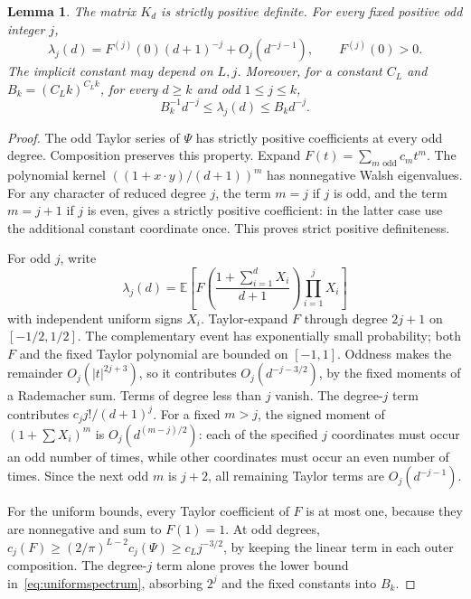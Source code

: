 \documentclass[11pt,a4paper]{article}
\newtheorem{lemma}[theorem]{Lemma}
\theoremstyle{remark}\newtheorem{remark}[theorem]{Remark}
\newcommand{\E}{\mathbb E}\newcommand{\Pp}{\mathbb P}
\begin{document}
\begin{lemma}\label{lem:spectrum}
The matrix $K_d$ is strictly positive definite. For every fixed positive
odd integer $j$,
\begin{equation}\label{eq:spectralasymptotic}
 \lambda_j(d)=F^{(j)}(0)(d+1)^{-j}+O_j(d^{-j-1}),
 \qquad F^{(j)}(0)>0.
\end{equation}
The implicit constant may depend on $L,j$. Moreover, for a constant $C_L$
and $B_k=(C_Lk)^{C_Lk}$, for every $d\ge k$ and odd $1\le j\le k$,
\begin{equation}\label{eq:uniformspectrum}
 B_k^{-1}d^{-j}\le\lambda_j(d)\le B_kd^{-j}.
\end{equation}
\end{lemma}
\begin{proof}
The odd Taylor series of $\Psi$ has strictly positive coefficients at
every odd degree. Composition preserves this property. Expand
$F(t)=\sum_{m\text{ odd}}c_mt^m$. The polynomial kernel
$((1+x\cdot y)/(d+1))^m$ has nonnegative Walsh eigenvalues. For any
character of reduced degree $j$, the term $m=j$ if $j$ is odd, and the
term $m=j+1$ if $j$ is even, gives a strictly positive coefficient:
in the latter case use the additional constant coordinate once. This
proves strict positive definiteness.

For odd $j$, write
\[
 \lambda_j(d)=\E\left[
 F\!\left(\frac{1+\sum_{i=1}^d X_i}{d+1}\right)
 \prod_{i=1}^jX_i\right]
\]
with independent uniform signs $X_i$. Taylor-expand $F$ through degree
$2j+1$ on $[-1/2,1/2]$. The complementary event has exponentially small
probability; both $F$ and the fixed Taylor polynomial are bounded on
$[-1,1]$. Oddness makes the remainder $O_j(|t|^{2j+3})$, so it contributes
$O_j(d^{-j-3/2})$, by the fixed moments of a Rademacher sum. Terms of
degree less than $j$ vanish. The degree-$j$ term contributes
$c_jj!/(d+1)^j$. For a fixed $m>j$, the signed moment of
$(1+\sum X_i)^m$ is $O_j(d^{(m-j)/2})$: each of the specified $j$
coordinates must occur an odd number of times, while other coordinates
must occur an even number of times. Since the next odd $m$ is $j+2$,
all remaining Taylor terms are $O_j(d^{-j-1})$.

For the uniform bounds, every Taylor coefficient of $F$ is at most one,
because they are nonnegative and sum to $F(1)=1$. At odd degrees,
$c_j(F)\ge(2/\pi)^{L-2}c_j(\Psi)\ge c_Lj^{-3/2}$, by keeping the
linear term in each outer composition. The degree-$j$ term alone proves
the lower bound in~\eqref{eq:uniformspectrum}, absorbing $2^j$ and the
fixed constants into $B_k$.


\end{proof}
\end{document}
